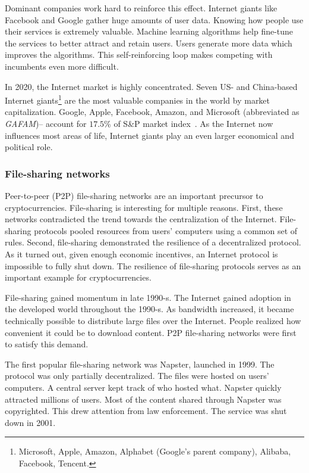 Dominant companies work hard to reinforce this effect.
Internet giants like Facebook and Google gather huge amounts of user data.
Knowing how people use their services is extremely valuable.
Machine learning algorithms help fine-tune the services to better attract and retain users.
Users generate more data which improves the algorithms.
This self-reinforcing loop makes competing with incumbents even more difficult.

In 2020, the Internet market is highly concentrated.
Seven US- and China-based Internet giants\footnote{Microsoft, Apple, Amazon, Alphabet (Google's parent company), Alibaba, Facebook, Tencent.} are the most valuable companies in the world by market capitalization.
Google, Apple, Facebook, Amazon, and Microsoft (abbreviated as \textit{GAFAM})-- account for $17.5$\% of S\&P market index~\cite{Levy2020}.
As the Internet now influences most areas of life, Internet giants play an even larger economical and political role.


\subsubsection*{File-sharing networks}

Peer-to-peer (P2P) file-sharing networks are an important precursor to cryptocurrencies.
File-sharing is interesting for multiple reasons.
First, these networks contradicted the trend towards the centralization of the Internet.
File-sharing protocols pooled resources from users' computers using a common set of rules.
Second, file-sharing demonstrated the resilience of a decentralized protocol.
As it turned out, given enough economic incentives, an Internet protocol is impossible to fully shut down.
The resilience of file-sharing protocols serves as an important example for cryptocurrencies.

File-sharing gained momentum in late 1990-s.
The Internet gained adoption in the developed world throughout the 1990-s.
As bandwidth increased, it became technically possible to distribute large files over the Internet.
People realized how convenient it could be to download content.
P2P file-sharing networks were first to satisfy this demand.

The first popular file-sharing network was Napster, launched in 1999.
The protocol was only partially decentralized.
The files were hosted on users' computers.
A central server kept track of who hosted what.
Napster quickly attracted millions of users.
Most of the content shared through Napster was copyrighted.
This drew attention from law enforcement.
The service was shut down in 2001.

